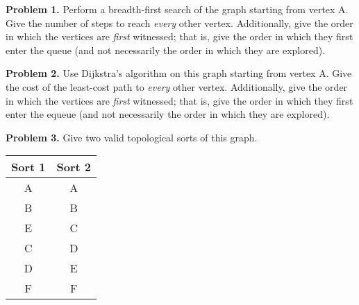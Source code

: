 \documentclass{article}
\begin{document}

\vspace*{5mm}\par\textbf{Problem 1.} Perform a breadth-first search of the graph starting from vertex A.  Give the number of steps to reach \emph{every} other vertex.  Additionally, give the order in which the vertices are \emph{first} witnessed; that is, give the order in which they first enter the queue (and not necessarily the order in which they are explored).\par


\vspace*{10mm}\par\textbf{Problem 2.} Use Dijkstra's algorithm on this graph starting from vertex A.  Give the cost of the least-cost path to \emph{every} other vertex.  Additionally, give the order in which the vertices are \emph{first} witnessed; that is, give the order in which they first enter the equeue (and not necessarily the order in which they are explored).\par


\vspace*{10mm}\par\textbf{Problem 3.} Give two valid topological sorts of this graph.\par



\begin{center}
    \begin{tabular}{||c c||} 
     \hline
     Sort 1 & Sort 2\\ [0.5ex] 
     \hline\hline
     A & A  \\ 
     \hline
     B & B \\
     \hline
     E & C \\
     \hline
     C & D  \\
     \hline
     D & E \\  
     \hline
     F & F \\ [1ex] 
     \hline
    \end{tabular}
\end{center}
\end{document}
